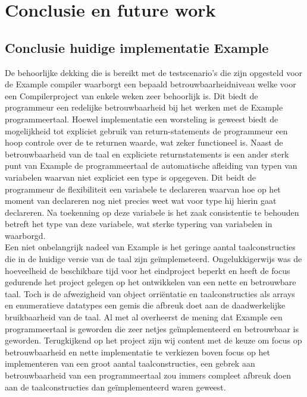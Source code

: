 \chapter{Conclusie en future work}

\section{Conclusie huidige implementatie Example}
De behoorlijke dekking die is bereikt met de testscenario's die zijn opgesteld voor de Example compiler waarborgt een bepaald betrouwbaarheidniveau welke voor een Compilerproject van enkele weken zeer behoorlijk is. Dit biedt de programmeur een redelijke betrouwbaarheid bij het werken met de Example programmeertaal. Hoewel implementatie een worsteling is geweest biedt de mogelijkheid tot expliciet gebruik van return-statements de programmeur een hoop controle over de te returnen waarde, wat zeker functioneel is. Naast de betrouwbaarheid van de taal en expliciete returnstatements is een ander sterk punt van Example de programmeertaal de automatische afleiding van typen van variabelen waarvan niet expliciet een type is opgegeven. Dit beidt de programmeur de flexibiliteit een variabele te declareren waarvan hoe op het moment van declareren nog niet precies weet wat voor type hij hierin gaat declareren. Na toekenning op deze variabele is het zaak consistentie te behouden betreft het type van deze variabele, wat sterke typering van variabelen in waarborgd.\\

Een niet onbelangrijk nadeel van Example is het geringe aantal taalconstructies die in de huidige versie van de taal zijn ge\"{i}mplemeteerd. Ongelukkigerwijs was de hoeveelheid de beschikbare tijd voor het eindproject beperkt en heeft de focus gedurende het project gelegen op het ontwikkelen van een nette en betrouwbare taal. Toch is de afwezigheid van object orri\"{e}ntatie en taalconstructies als arrays en enumeratieve datatypes een gemis die afbreuk doet aan de daadwerkelijke bruikbaarheid van de taal. Al met al overheerst de mening dat Example een programmeertaal is geworden die zeer netjes ge\"{i}mplementeerd en betrouwbaar is geworden. Terugkijkend op het project zijn wij content met de keuze om focus op betrouwbaarheid en nette implementatie te verkiezen boven focus op het implementeren van een groot aantal taalconstructies, een gebrek aan betrouwbaarheid van een programmeertaal zou immers compleet afbreuk doen aan de taalconstructies dan ge\"{i}mplementeerd waren geweest.

